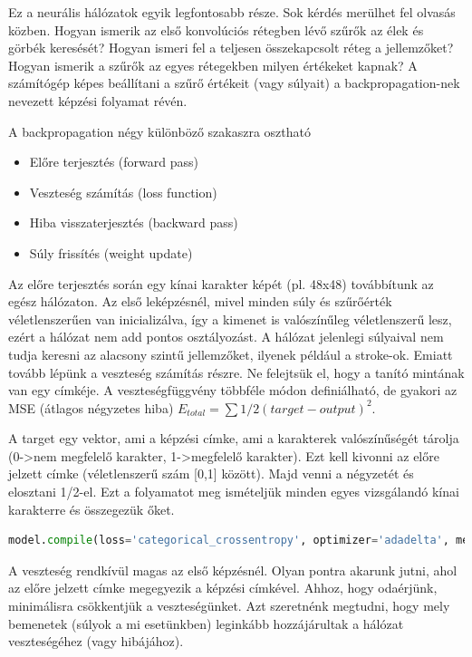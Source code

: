 Ez a neurális hálózatok egyik legfontosabb része. Sok kérdés merülhet fel olvasás közben. Hogyan ismerik az első konvolúciós rétegben lévő szűrők az élek és görbék keresését? Hogyan ismeri fel a teljesen összekapcsolt réteg a jellemzőket? Hogyan ismerik a szűrők az egyes rétegekben milyen értékeket kapnak? A számítógép képes beállítani a szűrő értékeit (vagy súlyait) a backpropagation-nek nevezett képzési folyamat révén.

A backpropagation négy különböző szakaszra osztható
\begin{itemize}
\item Előre terjesztés (forward pass)
\item Veszteség számítás (loss function)
\item Hiba visszaterjesztés (backward pass)
\item Súly frissítés (weight update)
\end{itemize}

Az előre terjesztés során egy kínai karakter képét (pl. 48x48) továbbítunk az egész hálózaton. Az első leképzésnél, mivel minden súly és szűrőérték véletlenszerűen van inicializálva, így a kimenet is valószínűleg véletlenszerű lesz, ezért a hálózat nem add pontos osztályozást. A hálózat jelenlegi súlyaival nem tudja keresni az alacsony szintű jellemzőket, ilyenek például a stroke-ok. Emiatt tovább lépünk a veszteség számítás részre. Ne felejtsük el, hogy a tanító mintának van egy címkéje. A veszteségfüggvény többféle módon definiálható, de gyakori az MSE (átlagos négyzetes hiba) \(E_{total} = \sum 1/2(target - output)^2\). 

A target egy vektor, ami a képzési címke, ami a karakterek valószínűségét tárolja (0->nem megfelelő karakter, 1->megfelelő karakter). Ezt kell kivonni az előre jelzett címke (véletlenszerű szám [0,1] között). Majd venni a négyzetét és elosztani 1/2-el. Ezt a folyamatot meg ismételjük minden egyes vizsgálandó kínai karakterre és összegezük őket.

\begin{lstlisting}[language=Python]
model.compile(loss='categorical_crossentropy', optimizer='adadelta', metrics=['accuracy'])
\end{lstlisting}

A veszteség rendkívül magas az első képzésnél. Olyan pontra akarunk jutni, ahol az előre jelzett címke megegyezik a képzési címkével. Ahhoz, hogy odaérjünk, minimálisra csökkentjük a veszteségünket. Azt szeretnénk megtudni, hogy mely bemenetek (súlyok a mi esetünkben) leginkább hozzájárultak a hálózat veszteségéhez (vagy hibájához).

